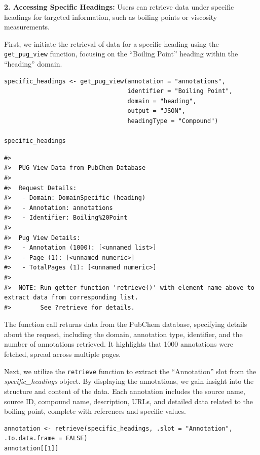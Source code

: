 \textbf{2. Accessing Specific Headings:} Users can retrieve data under specific headings for targeted information, such as boiling points or viscosity measurements.

First, we initiate the retrieval of data for a specific heading using the \texttt{get\_pug\_view} function, focusing on the ``Boiling Point'' heading within the ``heading'' domain.

\begin{verbatim}
specific_headings <- get_pug_view(annotation = "annotations", 
                                  identifier = "Boiling Point", 
                                  domain = "heading", 
                                  output = "JSON", 
                                  headingType = "Compound")

specific_headings
\end{verbatim}

\begin{verbatim}
#> 
#>  PUG View Data from PubChem Database 
#> 
#>  Request Details:  
#>   - Domain: DomainSpecific (heading)
#>   - Annotation: annotations
#>   - Identifier: Boiling%20Point
#> 
#>  Pug View Details: 
#>   - Annotation (1000): [<unnamed list>] 
#>   - Page (1): [<unnamed numeric>] 
#>   - TotalPages (1): [<unnamed numeric>] 
#> 
#>  NOTE: Run getter function 'retrieve()' with element name above to extract data from corresponding list. 
#>        See ?retrieve for details.
\end{verbatim}

The function call returns data from the PubChem database, specifying details about the request, including the domain, annotation type, identifier, and the number of annotations retrieved. It highlights that 1000 annotations were fetched, spread across multiple pages.

Next, we utilize the \texttt{retrieve} function to extract the ``Annotation'' slot from the \emph{specific\_headings} object. By displaying the annotations, we gain insight into the structure and content of the data. Each annotation includes the source name, source ID, compound name, description, URLs, and detailed data related to the boiling point, complete with references and specific values.

\begin{verbatim}
annotation <- retrieve(specific_headings, .slot = "Annotation", .to.data.frame = FALSE)
annotation[[1]]
\end{verbatim}

